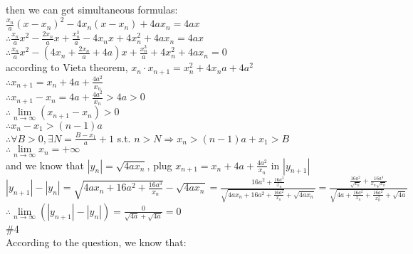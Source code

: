 \documentclass{article}
\begin{document}
then we can get simultaneous formulas: $\displaystyle\frac{x_n}{a}(x-x_n)^2-4x_n(x-x_n)+4ax_n=4ax$\\

$\therefore$\qquad$\displaystyle\frac{x_n}{a}x^2-\frac{2x_n}{a}x+\frac{x_n^3}{a}-4x_nx+4x_n^2+4ax_n=4ax$\\

$\therefore$\qquad$\displaystyle\frac{x_n}{a}x^2-(4x_n+\frac{2x_n}{a}+4a)x+\frac{x_n^3}{a}+4x_n^2+4ax_n=0$\\

according to Vieta theorem, $x_n\cdot x_{n+1}=x_n^2+4x_na+4a^2$\\

$\therefore$\qquad$\displaystyle x_{n+1}=x_n+4a+\frac{4a^2}{x_n}$\\

$\therefore$\qquad$x_{n+1}-x_n=4a+\displaystyle\frac{4a^2}{x_n}>4a>0$\\

$\therefore$\qquad$\lim \limits_{n \to \infty}(x_{n+1}-x_n)>0$\\

$\therefore$\qquad$x_n-x_1>(n-1)a$\\

$\therefore$\qquad$\forall B>0, \exists N=\displaystyle\frac{B-x_1}{a}+1$ s.t. $n>N \Rightarrow x_n>(n-1)a+x_1>B$\\

$\therefore$\qquad$\lim \limits_{n \to \infty}x_n=+\infty$\\

and we know that $|y_n|=\sqrt{4ax_n}$, plug $x_{n+1}=x_n+4a+\frac{4a^2}{x_n}$ in $|y_{n+1}|$\\

$\displaystyle|y_{n+1}|-|y_n|=\sqrt{4ax_n+16a^2+\frac{16a^3}{x_n}}-\sqrt{4ax_n}=\frac{16a^2+\frac{16a^3}{x_n}}{\sqrt{4ax_n+16a^2+\frac{16a^2}{x_n}}+\sqrt{4ax_n}}=\frac{\frac{16a^2}{\sqrt{x_n}}+\frac{16a^3}{x_n\sqrt{x_n}}}{\sqrt{4a+\frac{16a^2}{x_n}+\frac{16a^2}{x_n^2}}+\sqrt{4a}}$\\

$\therefore$\qquad$\displaystyle\lim \limits_{n \to \infty}\left(|y_{n+1}|-|y_n|\right)=\frac{0}{\sqrt{4a}+\sqrt{4a}}=0$\\

\textcolor[rgb]{0.00,0.00,0.50}{\#4}\\

According to the question, we know that:\\
\end{document}
